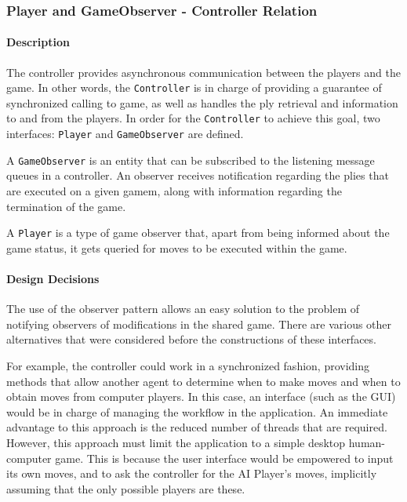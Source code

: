 			\subsubsection{Player and GameObserver - Controller Relation}\label{player-observer}
					\paragraph{Description} The controller provides asynchronous communication between the players and 
								the game. In other words, the \texttt{Controller} is in charge of providing a guarantee
								of synchronized calling to game, as well as handles the ply retrieval and information to and 
								from the players. In order for the \texttt{Controller} to achieve this goal, two interfaces: 
								\texttt{Player} and \texttt{GameObserver} are defined. 
								
								A \texttt{GameObserver} is an entity that can be subscribed to 
 								the listening message queues in a controller. An observer receives notification regarding 
 								the plies that are executed on a given gamem, along with information regarding the termination of the game.
 								
 								A \texttt{Player} is a type of game observer that, apart from being informed about the game status, 
 								it gets queried for moves to be executed within the game. 
 								
					\paragraph{Design Decisions} 
																The use of the observer pattern allows an easy solution to the problem of notifying 
																observers of modifications in the shared game. There are various other alternatives
																that were considered before the constructions of these interfaces.
																
																For example, the controller could work in a synchronized fashion, providing methods
																that allow another agent to determine when to make moves and when to obtain moves from 
																computer players. In this case, an interface (such as the GUI) would be in charge of 
																managing the workflow in the application. An immediate advantage to this
																approach is the reduced number of threads that are required. However, this approach 
																must limit the application to a simple desktop human-computer game. This is because
																the user interface would be empowered to input its own moves, and to ask the
																controller for the AI Player's moves, implicitly assuming that the only possible
																players are these. 
																
